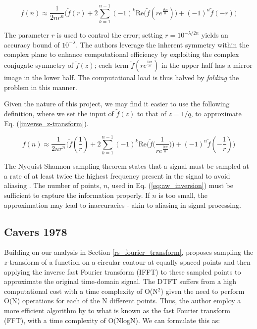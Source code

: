\documentclass[a4paper]{report}
\begin{document}
\begin{equation}\label{aw_inversion_original}
	f(n) \approx \frac{1}{2nr^n} \biggr( \tilde{f}(r) + 2\sum^{n-1}_{k = 1} (-1)^k \mathrm{Re}\bigg( \tilde{f}(re^{\frac{ik\pi}{n}})\bigg) + (-1)^n\tilde{f}(-r) \biggl)
\end{equation}

The parameter $r$ is used to control the error; setting $r = 10^{-\lambda / 2n}$ yields an accuracy bound of $10^{-\lambda}$. The authors leverage the inherent symmetry within the complex plane to enhance computational efficiency by exploiting the complex conjugate symmetry of $\tilde{f}(z)$; each term $\tilde{f}(re^{\frac{ik\pi}{n}})$ in the upper half has a mirror image in the lower half. The computational load is thus halved by \textit{folding} the problem in this manner.

Given the nature of this project, we may find it easier to use the following definition, where we set the input of $\tilde{f}(z)$ to that of $z = 1 / q$, to approximate Eq. (\ref{inverse_z-transform}).

\begin{equation}\label{eq:aw_inversion}
	f(n) \approx \frac{1}{2nr^n} \biggr( \tilde{f}(\frac{1}{r}) + 2\sum^{n-1}_{k = 1} (-1)^k \text{Re}\bigg( \tilde{f}\big(\frac{1}{re^{\frac{ik\pi}{n}}}\big)\bigg) + (-1)^n\tilde{f}(-\frac{1}{r}) \biggl)
\end{equation}

The Nyquist-Shannon sampling theorem states that a signal must be sampled at a rate of at least twice the highest frequency present in the signal to avoid aliasing \citep{shannon1949communication,nyquist1928certain}. The number of points, $n$, used in Eq. (\ref{eq:aw_inversion}) must be sufficient to capture the information properly. If $n$ is too small, the approximation may lead to inaccuracies - akin to aliasing in signal processing.

\subsection{Cavers 1978}\label{section:cavers}
Building on our analysis in Section \ref{rs_fourier_transform}, \citet{Cavers1978FFT} proposes sampling the $z$-transform of a function on a circular contour at equally spaced points and then applying the inverse fast Fourier transform (IFFT) to these sampled points to approximate the original time-domain signal. The DTFT suffers from a high computational cost with a time complexity of O(N$^2$) given the need to perform O(N) operations for each of the N different points. Thus, the author employ a more efficient algorithm by \citet{cooley1965algorithm} to what is known as the fast Fourier transform (FFT), with a time complexity of O(NlogN). We can formulate this as:
\end{document}
